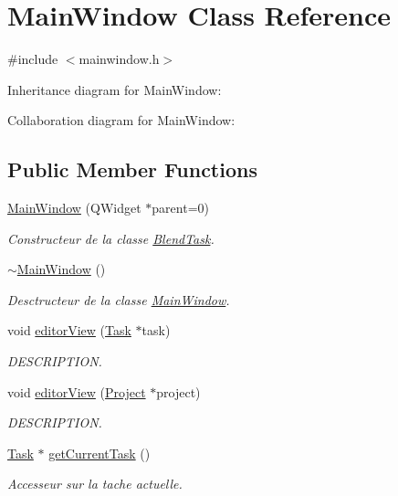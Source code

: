 \hypertarget{class_main_window}{}\section{Main\+Window Class Reference}
\label{class_main_window}


{\ttfamily \#include $<$mainwindow.\+h$>$}



Inheritance diagram for Main\+Window\+:


Collaboration diagram for Main\+Window\+:
\subsection*{Public Member Functions}
\begin{DoxyCompactItemize}
\item 
\hyperlink{class_main_window_a8b244be8b7b7db1b08de2a2acb9409db}{Main\+Window} (Q\+Widget $\ast$parent=0)
\begin{DoxyCompactList}\small\item\em Constructeur de la classe \hyperlink{class_blend_task}{Blend\+Task}. \end{DoxyCompactList}\item 
\hyperlink{class_main_window_ae98d00a93bc118200eeef9f9bba1dba7}{$\sim$\+Main\+Window} ()
\begin{DoxyCompactList}\small\item\em Desctructeur de la classe \hyperlink{class_main_window}{Main\+Window}. \end{DoxyCompactList}\item 
void \hyperlink{class_main_window_a2932a00fc0241bb6273da866813c5e69}{editor\+View} (\hyperlink{class_task}{Task} $\ast$task)
\begin{DoxyCompactList}\small\item\em D\+E\+S\+C\+R\+I\+P\+T\+I\+O\+N. \end{DoxyCompactList}\item 
void \hyperlink{class_main_window_a0e4a43063a59d0de0c25d6e4d53f92c1}{editor\+View} (\hyperlink{class_project}{Project} $\ast$project)
\begin{DoxyCompactList}\small\item\em D\+E\+S\+C\+R\+I\+P\+T\+I\+O\+N. \end{DoxyCompactList}\item 
\hyperlink{class_task}{Task} $\ast$ \hyperlink{class_main_window_a397cbcb732c184e8998fa8828b8311ab}{get\+Current\+Task} ()
\begin{DoxyCompactList}\small\item\em Accesseur sur la tache actuelle. \end{DoxyCompactList}\end{DoxyCompactItemize}



